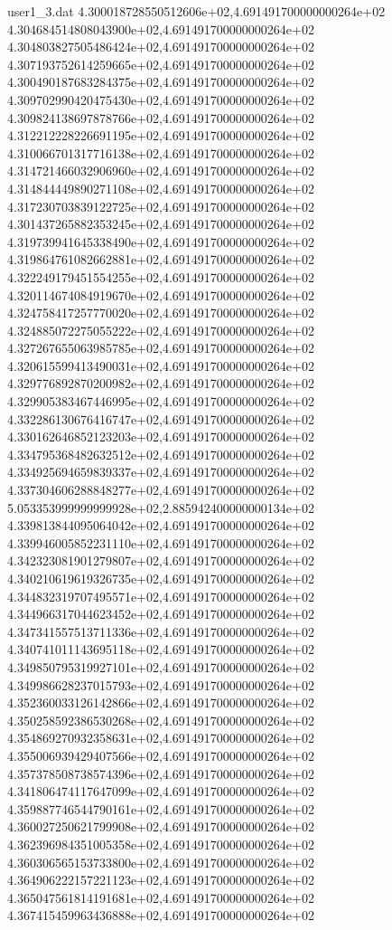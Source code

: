 \begin{filecontents}{user1_3.dat}
4.300018728550512606e+02,4.691491700000000264e+02
4.304684514808043900e+02,4.691491700000000264e+02
4.304803827505486424e+02,4.691491700000000264e+02
4.307193752614259665e+02,4.691491700000000264e+02
4.300490187683284375e+02,4.691491700000000264e+02
4.309702990420475430e+02,4.691491700000000264e+02
4.309824138697878766e+02,4.691491700000000264e+02
4.312212228226691195e+02,4.691491700000000264e+02
4.310066701317716138e+02,4.691491700000000264e+02
4.314721466032906960e+02,4.691491700000000264e+02
4.314844449890271108e+02,4.691491700000000264e+02
4.317230703839122725e+02,4.691491700000000264e+02
4.301437265882353245e+02,4.691491700000000264e+02
4.319739941645338490e+02,4.691491700000000264e+02
4.319864761082662881e+02,4.691491700000000264e+02
4.322249179451554255e+02,4.691491700000000264e+02
4.320114674084919670e+02,4.691491700000000264e+02
4.324758417257770020e+02,4.691491700000000264e+02
4.324885072275055222e+02,4.691491700000000264e+02
4.327267655063985785e+02,4.691491700000000264e+02
4.320615599413490031e+02,4.691491700000000264e+02
4.329776892870200982e+02,4.691491700000000264e+02
4.329905383467446995e+02,4.691491700000000264e+02
4.332286130676416747e+02,4.691491700000000264e+02
4.330162646852123203e+02,4.691491700000000264e+02
4.334795368482632512e+02,4.691491700000000264e+02
4.334925694659839337e+02,4.691491700000000264e+02
4.337304606288848277e+02,4.691491700000000264e+02
5.053353999999999928e+02,2.885942400000000134e+02
4.339813844095064042e+02,4.691491700000000264e+02
4.339946005852231110e+02,4.691491700000000264e+02
4.342323081901279807e+02,4.691491700000000264e+02
4.340210619619326735e+02,4.691491700000000264e+02
4.344832319707495571e+02,4.691491700000000264e+02
4.344966317044623452e+02,4.691491700000000264e+02
4.347341557513711336e+02,4.691491700000000264e+02
4.340741011143695118e+02,4.691491700000000264e+02
4.349850795319927101e+02,4.691491700000000264e+02
4.349986628237015793e+02,4.691491700000000264e+02
4.352360033126142866e+02,4.691491700000000264e+02
4.350258592386530268e+02,4.691491700000000264e+02
4.354869270932358631e+02,4.691491700000000264e+02
4.355006939429407566e+02,4.691491700000000264e+02
4.357378508738574396e+02,4.691491700000000264e+02
4.341806474117647099e+02,4.691491700000000264e+02
4.359887746544790161e+02,4.691491700000000264e+02
4.360027250621799908e+02,4.691491700000000264e+02
4.362396984351005358e+02,4.691491700000000264e+02
4.360306565153733800e+02,4.691491700000000264e+02
4.364906222157221123e+02,4.691491700000000264e+02
4.365047561814191681e+02,4.691491700000000264e+02
4.367415459963436888e+02,4.691491700000000264e+02

\end{filecontents}
